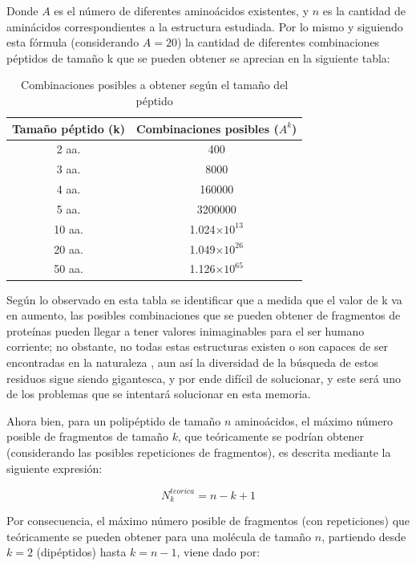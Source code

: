 Donde $A$ es el número de diferentes aminoácidos existentes, y $n$ es la cantidad de aminácidos correspondientes a la estructura estudiada. Por lo mismo y siguiendo esta fórmula (considerando $A=20$) la cantidad de diferentes combinaciones péptidos de tamaño k que se pueden obtener se aprecian en la siguiente tabla:

\begin{table}[H]
\centering
\label{my-label2}
\begin{tabular}{|c|c|}
\hline
Tamaño péptido (k) & \multicolumn{1}{c|}{Combinaciones posibles ($A^{k}$)}  \\ \hline
2 aa.     & 400        \\
3 aa.     & 8000                         \\
4 aa.      &      160000                             \\
5 aa.      &   3200000       \\
10 aa.      &   1.024$\times 10^{13}$       \\
20 aa.      &   1.049$\times 10^{26}$       \\
50 aa.   &     1.126$\times 10^{65}$   \\ \hline
\end{tabular}
\caption{Combinaciones posibles a obtener según el tamaño del péptido}
\end{table}

Según lo observado en esta tabla se identificar que a medida que el valor de k va en aumento, las posibles combinaciones que se pueden obtener de fragmentos de proteínas pueden llegar a tener valores inimaginables para el ser humano corriente; no obstante, no todas estas estructuras existen o son capaces de ser encontradas en la naturaleza \cite{array}, aun así la diversidad de la búsqueda de estos residuos sigue siendo gigantesca, y por ende difícil de solucionar, y este será uno de los problemas que se intentará solucionar en esta memoria.

Ahora bien, para un polipéptido de tamaño $n$ aminoácidos, el máximo número posible de fragmentos de tamaño $k$, que teóricamente se podrían obtener (considerando las posibles repeticiones de fragmentos), es descrita mediante la siguiente expresión:

\begin{equation}
N_{k}^{teorica}=n-k+1
\end{equation}

Por consecuencia, el máximo número posible de fragmentos (con repeticiones) que teóricamente se pueden obtener para una molécula de tamaño $n$, partiendo desde $k=2$ (dipéptidos) hasta $k=n-1$, viene dado por:

